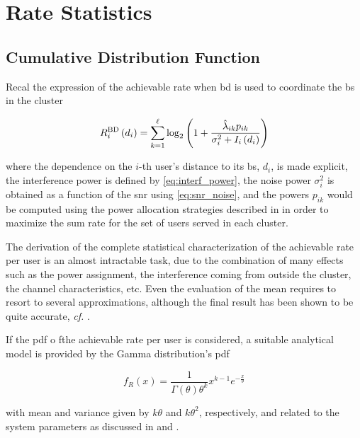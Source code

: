 \section{Rate Statistics}\label{sec:stats_rate_stats}
\subsection{Cumulative Distribution Function}\label{ssec:stats_cdf}

Recal the expression of the achievable rate when \gls{bd} is used to coordinate
the \gls{bs} in the cluster

\begin{equation} \label{eq:stats_achiev_rate}
    R_i^{\text{BD}}\left(d_i\right) = \sum\limits_{k = 1}^{\ell} \log_2 \left(
    1 + \frac{\hat{\lambda}_{ik} p_{ik}}{\sigma_i^2 + I_i\left(d_i\right)} \right)
\end{equation}

\noindent
where the dependence on the $i$-th user's distance to its \gls{bs}, $d_i$, is
made explicit, the interference power is defined by \eqref{eq:interf_power}, the
noise power $\sigma_i^2$ is obtained as a function of the \gls{snr} using
\eqref{eq:snr_noise}, and the powers $p_{ik}$ would be computed using the power
allocation strategies described in  in order to
maximize the sum rate for the set of users served in each cluster.

The derivation of the complete statistical characterization of the achievable
rate per user is an almost intractable task, due to the combination of many
effects such as the power assignment, the interference coming from outside the
cluster, the channel characteristics, etc. Even the evaluation of the mean
requires to resort to several approximations, although the final result has been
shown to be quite accurate, \emph{cf.} .

If the \gls{pdf} o fthe achievable rate per user is considered, a suitable
analytical model is provided by the Gamma distribution's \gls{pdf}

\begin{equation} \label{eq:gamma_pdf}
   f_{R}\left(x\right) = \frac{1}{\Gamma\left(\theta\right)\theta^k}x^{k-1}
   e^{-\frac{x}{\theta}}
\end{equation}

\noindent
with mean and variance given by $k\theta$ and $k\theta^2$, respectively, and
related to the system parameters as discussed in  and
.

